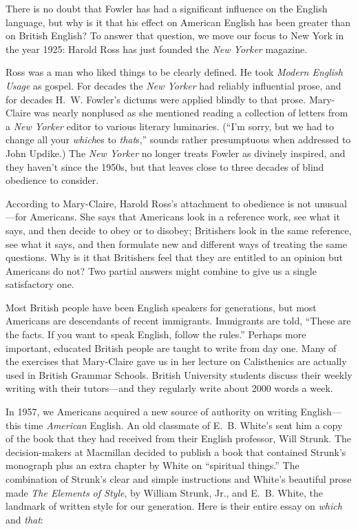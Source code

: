 There is no doubt that Fowler has had a significant influence on the
English language, but why is it that his effect on American English has
been greater than on British English?  To answer that question, we move
our focus to New York in the year 1925: Harold Ross has just founded the
{\sl New Yorker\/} magazine.

Ross was a man who liked things to be clearly defined.  He took {\sl Modern
English Usage\/} as gospel.  For decades the {\sl New Yorker\/} had reliably
influential prose, and for decades H.~W. Fowler's dictums were applied
blindly to that prose.  Mary-Claire was nearly nonplused as she
mentioned reading a collection of letters from a {\sl New Yorker\/} editor to
various literary luminaries. (``I'm sorry, but we had to change all your
{\it which\/}es to {\it that\/}s,'' sounds rather presumptuous when addressed to
John Updike.) The {\sl New Yorker\/} no longer treats Fowler as divinely
inspired, and they haven't since the 1950s, but that leaves close to
three decades of blind obedience to consider.

According to Mary-Claire, Harold Ross's attachment to obedience is not
unusual---for Americans.  She says that Americans look in a reference work,
see what it says, and then decide to  obey  or to disobey; Britishers look
in the same reference, see what it says, and then formulate new and
different ways of treating the same questions. Why is it that Britishers
feel that they are entitled to an opinion but Americans do not?  Two
partial answers might combine to give us a single satisfactory one.

Most British people have been English speakers for generations, but most
Americans are descendants of recent immigrants.  Immigrants are told, ``These
are the facts.  If you want to speak English, follow the rules.''  Perhaps
more important, educated British people are taught to write from day one.
Many of the exercises that Mary-Claire gave us in her lecture on
Calisthenics are actually used in British Grammar Schools.  British
University students discuss their weekly writing with their tutors---and
they regularly write about 2000 words a week.

In 1957, we Americans acquired a new source of authority on writing
English---this time {\it American\/} English.  An old classmate of E.~B. White's
sent him a copy of the book that they had received from their English
professor, Will Strunk.  The decision-makers at Macmillan decided to
publish a book that contained Strunk's monograph plus an extra chapter by
White on ``spiritual things.''  The combination of Strunk's clear and simple
instructions and White's beautiful prose made {\sl The Elements of Style}, by
William Strunk, Jr., and E.~B. White, the landmark of written style for
our generation.  Here is their entire essay on {\it which\/} and {\it that\/}:

